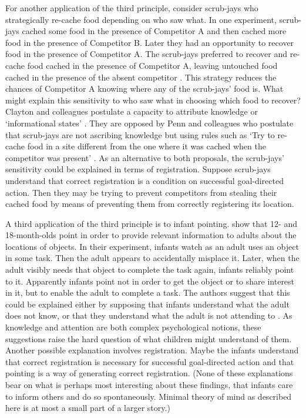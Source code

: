 \documentclass[12pt,\papersize]{extarticle}
\begin{document}
For another application of the third principle, consider scrub-jays who strategically re-cache food depending on who saw what.  In one experiment, scrub-jays cached some food in the presence of Competitor A and then cached more food in the presence of Competitor B.  
Later they had an opportunity to recover food in the presence of Competitor A.  
The scrub-jays preferred to recover and re-cache food cached in the presence of Competitor A, leaving untouched food cached in the presence of the absent competitor \citep[][pp.\ 517-9]{Clayton:2007fh}.  This strategy reduces the chances of Competitor A knowing where any of the scrub-jays’ food is.  What might explain this sensitivity to who saw what in choosing which food to recover?  Clayton and colleagues postulate a capacity to attribute knowledge or `informational states' \citep[]{Clayton:2007fh}.  They are opposed by Penn and colleagues who postulate that scrub-jays are not ascribing knowledge but using rules such as `Try to re-cache food in a site different from the one where it was cached when the competitor was present' \citep[]{en_1417, Penn:2007ey}.  As an alternative to both proposals, the scrub-jays’ sensitivity could be explained in terms of registration.  Suppose scrub-jays understand that correct registration is a condition on successful goal-directed action.  Then they may be trying to prevent competitors from stealing their cached food by means of preventing them from correctly registering its location. 

A third application of the third principle is to infant pointing.  \citet{en_1093} show that 12- and 18-month-olds point in order to provide relevant information to adults about the locations of objects.  In their experiment, infants watch as an adult uses an object in some task.  Then the adult appears to accidentally misplace it.  Later, when the adult visibly needs that object to complete the task again, infants reliably point to it.  Apparently infants point not in order to get the object or to share interest in it, but to enable the adult to complete a task.  The authors suggest that this could be explained either by supposing that infants understand what the adult does not know, or that they understand what the adult is not attending to \citep[][p.\ 185]{en_1093}.  As knowledge and attention are both complex psychological notions, these suggestions raise the hard question of what children might understand of them.  Another possible explanation involves registration.  Maybe the infants understand that correct registration is necessary for successful goal-directed action and that pointing is a way of generating correct registration.  (None of these explanations bear on what is perhaps most interesting about these findings, that infants care to inform others and do so spontaneously.  Minimal theory of mind as described here is at most a small part of a larger story.)
\end{document}
